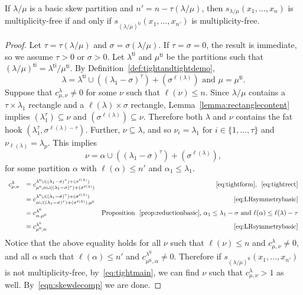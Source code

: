 \documentclass[ALCO,ThmDefs,Unicode,epreuves]{cedram}
\newcommand{\ti}{\mathsf{ti}}
\begin{document}
\begin{prop}
\label{prop:reductiontight}
If $\lambda / \mu$ is a basic skew partition and $n' = n - \tau(\lambda / \mu)$, then $s_{\lambda / \mu}(x_1,\ldots,x_n)$ is multiplicity-free if and only if $s_{(\lambda / \mu)^\ti }(x_1,\ldots,x_{n'})$ is multiplicity-free.
\end{prop}
\begin{proof}
Let $\tau = \tau(\lambda / \mu)$ and $\sigma = \sigma(\lambda/\mu)$. If $\tau = \sigma = 0$, the result is immediate, so we assume $\tau > 0$ or $\sigma > 0$. Let $\lambda^\ti $ and $\mu^\ti $ be the partitions such that $(\lambda / \mu)^\ti = \lambda^\ti / \mu^\ti $. By Definition~\ref{def:tightandtightdemo}, 
\begin{equation}
\label{eq:tightform}
\lambda = \lambda^\ti \cup ((\lambda_1-\sigma)^\tau) + (\sigma^{\ell(\lambda)}) \text{ and }\mu = \mu^\ti . 
\end{equation}
Suppose that $c_{\mu,\nu}^{\lambda} \neq 0$ for some $\nu$ such that $\ell(\nu) \leq n$. Since $\lambda / \mu$ contains a $\tau \times \lambda_1$ rectangle and a $\ell(\lambda)\times \sigma$ rectangle, Lemma~\ref{lemma:rectanglecontent} implies $(\lambda_1^\tau) \subseteq \nu$ and $(\sigma^{\ell(\lambda)})\subseteq \nu$. Therefore both $\lambda$ and $\nu$ contains the fat hook $(\lambda_1^{\tau}, \sigma^{\ell(\lambda)-\tau})$. Further, $\nu \subseteq \lambda$, and so $\nu_i = \lambda_1\text{ for }i \in \{1,\ldots,\tau \}$ and $\nu_{\ell(\lambda)} = \lambda_p$. This implies
\begin{equation}
\label{eq:tightrect}
\nu = \alpha \cup ((\lambda_1-\sigma)^\tau) + (\sigma^{\ell(\lambda)}),
\end{equation}
for some partition $\alpha$ with $\ell(\alpha) \leq n'$ and $\alpha_1 \leq \lambda_1$.
\begin{equation}
\begin{array}{rlr}
\label{eq:tightmain}
c_{\mu,\nu}^{\lambda} & = c_{\mu^\ti ,\alpha \cup ((\lambda_1-\sigma)^\tau) + (\sigma^{\ell(\lambda)})}^{\lambda^\ti \cup ((\lambda_1-\sigma)^\tau) + (\sigma^{\ell(\lambda)})} &~\eqref{eq:tightform}\text{, }~\eqref{eq:tightrect}\\[7pt]
& = c_{\alpha \cup ((\lambda_1-\sigma)^\tau) + (\sigma^{\ell(\lambda)}),\mu^\ti }^{\lambda^\ti \cup ((\lambda_1-\sigma)^\tau) + (\sigma^{\ell(\lambda)})} &~\eqref{eq:LRsymmetrybasic}\\[7pt]
& = c_{\alpha,\mu^\ti }^{\lambda^\ti } & \text{Proposition }~\ref{prop:reductionbasic}\text{, }\alpha_1 \leq \lambda_1-\sigma\text{ and }\ell(\alpha)\leq \ell(\lambda)-\tau \\[7pt]
& = c_{\mu^\ti , \alpha}^{\lambda^\ti } &~\eqref{eq:LRsymmetrybasic}
\end{array}
\end{equation}
Notice that the above equality holds for all $\nu$ such that $\ell(\nu) \leq n$ and $c_{\mu,\nu}^{\lambda} \neq 0$, and all $\alpha$ such that $\ell(\alpha) \leq n'$ and $c_{\mu^\ti , \alpha}^{\lambda^\ti } \neq 0$. Therefore if $s_{(\lambda/\mu)^\ti }(x_1,\ldots,x_{n'})$ is not multiplicity-free, by~\eqref{eq:tightmain}, we can find $\nu$ such that $c^{\lambda}_{\mu,\nu}> 1$ as well. By~\eqref{eqn:skewdecomp} we are done.
\end{proof}
\end{document}
